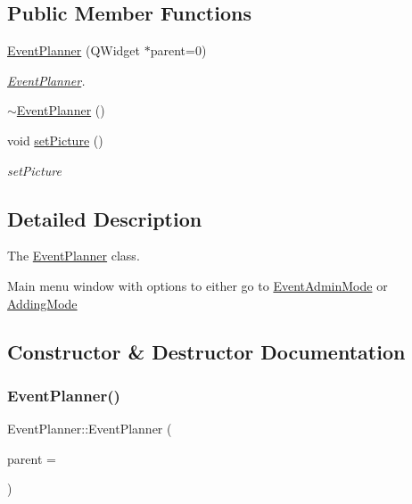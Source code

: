 \subsection*{Public Member Functions}
\begin{DoxyCompactItemize}
\item 
\hyperlink{class_event_planner_ae8b0e5c382c777476a003e3c099d5e38}{Event\+Planner} (Q\+Widget $\ast$parent=0)
\begin{DoxyCompactList}\small\item\em \hyperlink{class_event_planner}{Event\+Planner}. \end{DoxyCompactList}\item 
\hyperlink{class_event_planner_a0963c57038db491e25e7562a7701ae28}{$\sim$\+Event\+Planner} ()
\item 
void \hyperlink{class_event_planner_a2453c0478a2c0f60575e553dbea57f1e}{set\+Picture} ()
\begin{DoxyCompactList}\small\item\em set\+Picture \end{DoxyCompactList}\end{DoxyCompactItemize}


\subsection{Detailed Description}
The \hyperlink{class_event_planner}{Event\+Planner} class. 

Main menu window with options to either go to \hyperlink{class_event_admin_mode}{Event\+Admin\+Mode} or \hyperlink{class_adding_mode}{Adding\+Mode} 

\subsection{Constructor \& Destructor Documentation}
\mbox{\label{class_event_planner_ae8b0e5c382c777476a003e3c099d5e38}} 
\subsubsection{\texorpdfstring{Event\+Planner()}{EventPlanner()}}
{\footnotesize\ttfamily Event\+Planner\+::\+Event\+Planner (\begin{DoxyParamCaption}\item[{Q\+Widget $\ast$}]{parent = {} }\end{DoxyParamCaption})\hspace{0.3cm}{\ttfamily [explicit]}}



